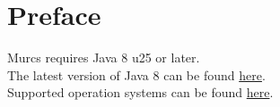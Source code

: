 \section{Preface}

Murcs requires Java 8 u25 or later.\\
The latest version of Java 8 can be found  \href{http://www.oracle.com/technetwork/java/javase/downloads/index-jsp-138363.html}{here}.\\
Supported operation systems can be found 
\href{http://www.oracle.com/technetwork/java/javase/certconfig-2095354.html}{here}.\\

\setcounter{page}{1}